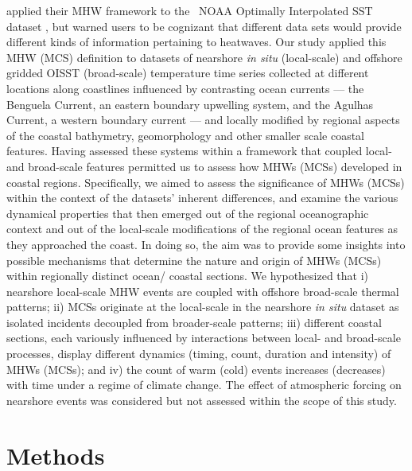 \documentclass[a4paper,10pt,review]{elsarticle}
\begin{document}
\citet{Hobday2016} applied their MHW framework to the \degree~NOAA Optimally Interpolated SST dataset \citep[hereafter referred to as OISST;][]{Reynolds2007}, but warned users to be cognizant that different data sets would provide different kinds of information pertaining to heatwaves. Our study applied this MHW (MCS) definition to datasets of nearshore \emph{in situ} (local-scale) and offshore gridded OISST (broad-scale) temperature time series collected at different locations along coastlines influenced by contrasting ocean currents --- the Benguela Current, an eastern boundary upwelling system, and the Agulhas Current, a western boundary current --- and locally modified by regional aspects of the coastal bathymetry, geomorphology and other smaller scale coastal features. Having assessed these systems within a framework that coupled local- and broad-scale features permitted us to assess how MHWs (MCSs) developed in coastal regions. Specifically, we aimed to assess the significance of MHWs (MCSs) within the context of the datasets’ inherent differences, and examine the various dynamical properties that then emerged out of the regional oceanographic context and out of the local-scale modifications of the regional ocean features as they approached the coast. In doing so, the aim was to provide some insights into possible mechanisms that determine the nature and origin of MHWs (MCSs) within regionally distinct ocean/ coastal sections. We hypothesized that i) nearshore local-scale MHW events are coupled with offshore broad-scale thermal patterns; ii) MCSs originate at the local-scale in the nearshore \emph{in situ} dataset as isolated incidents decoupled from broader-scale patterns; iii) different coastal sections, each variously influenced by interactions between local- and broad-scale processes, display different dynamics (timing, count, duration and intensity) of MHWs (MCSs); and iv) the count of warm (cold) events increases (decreases) with time under a regime of climate change. The effect of atmospheric forcing on nearshore events was considered but not assessed within the scope of this study.

\section{Methods}
\end{document}
